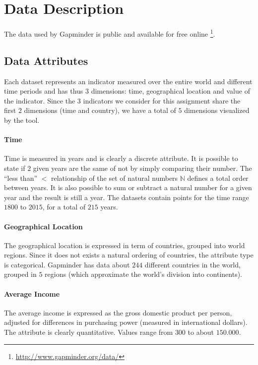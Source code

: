 \section{Data Description}
\label{sec:data}

The data used by Gapminder is public and available for free online \footnote{\url{http://www.gapminder.org/data/}}.

\subsection{Data Attributes}

Each dataset represents an indicator measured over the entire world and different time periods and has thus $3$ dimensions: time, geographical location and value of the indicator. Since the $3$ indicators we consider for this assignment share the first $2$ dimensions (time and country), we have a total of $5$ dimensions visualized by the tool.

\paragraph{Time}
Time is measured in years and is clearly a discrete attribute.
It is possible to state if $2$ given years are the same of not by simply comparing their number.
The ``less than'' $<$ relationship of the set of natural numbers $\mathbb{N}$ defines a total order between years.
It is also possible to sum or subtract a natural number for a given year and the result is still a year.
The datasets contain points for the time range $1800$ to $2015$, for a total of $215$ years.

\paragraph{Geographical Location}
The geographical location is expressed in term of countries, grouped into world regions.
Since it does not exists a natural ordering of countries, the attribute type is categorical.
Gapminder has data about $244$ different countries in the world, grouped in $5$ regions (which approximate the world's division into continents).

\paragraph{Average Income}
The average income is expressed as the gross domestic product per person, adjusted for differences in purchasing power (measured in international dollars).
The attribute is clearly quantitative.
Values range from $300$ to about $150.000$.

